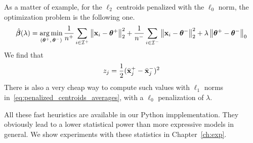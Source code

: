 As a matter of example, for the $\ell_2$ centroids penalized with the $\ell_0$ norm,
the optimization problem is the following one.
\begin{equation}\label{eq:penalized_centroids_averages}
    \hat{\bm{\beta}}(\lambda) = \operatorname*{arg\,min}_{( \bm{\theta}^+,\, \bm{\theta}^-)}
        \frac{1}{n^+} \sum_{i \in \mathcal{I}^+} \big\lVert \mathbf{x}_i - \bm{\theta}^+ \big\rVert^2_2
        + \frac{1}{n^-} \sum_{i \in \mathcal{I}^-} \big\lVert \mathbf{x}_i - \bm{\theta}^- \big\rVert^2_2
        + \lambda \left\lVert\bm{\theta}^+ - \bm{\theta}^-\right\rVert_0
\end{equation}
We find that
\begin{align*}
    z_j = \frac{1}{2}(\bar{\mathbf{x}}^+_j - \bar{\mathbf{x}}^-_j)^2
\end{align*}
There is also a very cheap way to compute such values with $\ell_1$ norms in~\ref{eq:penalized_centroids_averages},
with a $\ell_0$ penalization of $\lambda$.

\bigbreak
All these fast heuristics are available in our Python impplementation.
They obviously lead to a lower statistical power than more expressive models in general.
We show experiments with these statistics in Chapter~\ref{ch:exp}.
